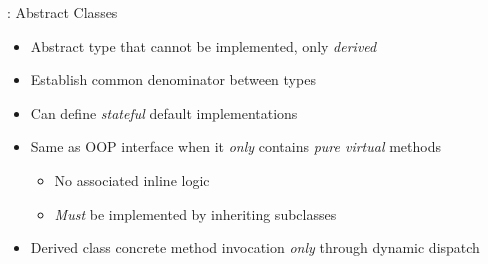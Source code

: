 \begin{frame}[fragile]{\underline{\cpp}: Abstract Classes \hfill {\footnotesize \currentname}}


    \begin{itemize}

        \item Abstract type that cannot be implemented, only \textit{derived}

        \item Establish common denominator between types

        \item Can define \textit{stateful} default implementations

        \item Same as OOP interface when it \textit{only} contains \textit{pure virtual} methods
            \begin{itemize}
                \item No associated inline logic
                \item \textit{Must} be implemented by inheriting subclasses
            \end{itemize}

        \item Derived class concrete method invocation \textit{only} through dynamic dispatch

    \end{itemize}

    \vfill

\end{frame}

